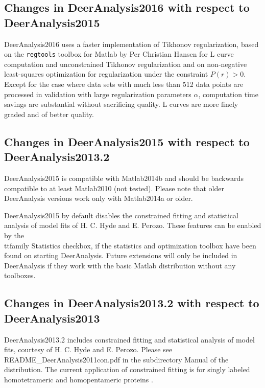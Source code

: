 \documentclass{article}
\begin{document}
\subsection{Changes in DeerAnalysis2016 with respect to DeerAnalysis2015}
\label{changes_2016}

DeerAnalysis2016 uses a faster implementation of Tikhonov regularization, based on the \texttt{regtools} toolbox for Matlab by Per Christian Hansen for L curve computation and unconstrained Tikhonov regularization and on non-negative least-squares optimization for regularization under the constraint $P(r) > 0$. Except for the case where data sets with much less than 512 data points are processed in validation with large regularization parameters $\alpha$, computation time savings are substantial without sacrificing quality. L curves are more finely graded and of better quality. 

\subsection{Changes in DeerAnalysis2015 with respect to DeerAnalysis2013.2}
\label{changes_2015}

DeerAnalysis2015 is compatible with Matlab2014b and should be backwards compatible to at least Matlab2010 (not tested). Please note that older DeerAnalysis versions work only with Matlab2014a or older. 

DeerAnalysis2015 by default disables the constrained fitting and statistical analysis of model fits of H. C. Hyde and E. Perozo. These features can be enabled by the {\\ttfamily Statistics} checkbox, if the statistics and optimization toolbox have been found on starting DeerAnalysis. Future extensions will only be included in DeerAnalysis if they work with the basic Matlab distribution without any toolboxes.

\subsection{Changes in DeerAnalysis2013.2 with respect to DeerAnalysis2013}
\label{changes_2013b}

DeerAnalysis2013.2 includes constrained fitting and statistical analysis of model fits, courtesy of H. C. Hyde and E. Perozo. Please see {\ttfamily README\_DeerAnalysis2011con.pdf} in the subdirectory {\ttfamily Manual} of the distribution. The current application of constrained fitting is for singly labeled homotetrameric and homopentameric proteins \cite{dalmas2012}.
\end{document}
